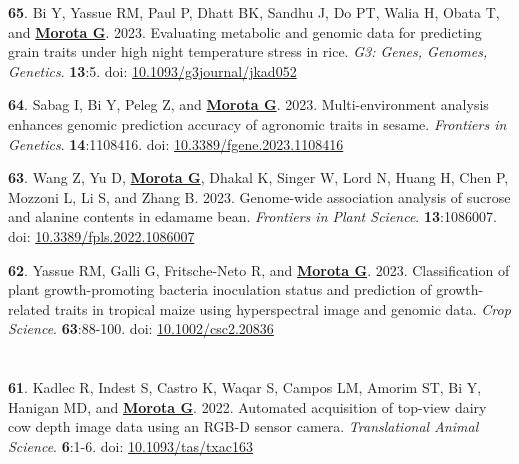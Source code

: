 \documentclass[margin,line,10pt]{res}
\newenvironment{list1}{
  \begin{list}{\ding{113}}{%
      \setlength{\itemsep}{0in}
      \setlength{\parsep}{0in} \setlength{\parskip}{0in}
      \setlength{\topsep}{0in} \setlength{\partopsep}{0in} 
      \setlength{\leftmargin}{0.17in}}}{\end{list}}
\begin{document}
\begin{resume}
\begin{list1}
  \vspace{0.5cm}

  \item [{\bf 65}.] Bi Y, Yassue RM, Paul P, Dhatt BK, Sandhu J, Do PT, Walia H, Obata T, and \textbf{\underline{Morota G}}. 2023. Evaluating metabolic and genomic data for predicting grain traits under high night temperature stress in rice. \emph{G3: Genes, Genomes, Genetics}. \textbf{13}:5. doi: \textcolor{blue}{\href{https://doi.org/10.1093/g3journal/jkad052}{10.1093/g3journal/jkad052}}  

  \vspace{0.5cm}

  \item [{\bf 64}.] Sabag I, Bi Y, Peleg Z, and \textbf{\underline{Morota G}}. 2023. Multi-environment analysis enhances genomic prediction accuracy of agronomic traits in sesame. \emph{Frontiers in Genetics}. \textbf{14}:1108416. doi: \textcolor{blue}{\href{https://doi.org/10.3389/fgene.2023.1108416}{10.3389/fgene.2023.1108416}}  

     \vspace{0.5cm}

  \item  [{\bf 63}.] Wang Z, Yu D, \textbf{\underline{Morota G}}, Dhakal K, Singer W, Lord N, Huang H, Chen P, Mozzoni L, Li S, and Zhang B. 2023. Genome-wide association analysis of sucrose and alanine contents in edamame bean. \emph{Frontiers in Plant Science}. \textbf{13}:1086007. doi: \textcolor{blue}{\href{10.3389/fpls.2022.1086007}{10.3389/fpls.2022.1086007}}  

  \vspace{0.5cm}

  \item [{\bf 62}.] Yassue RM, Galli G, Fritsche-Neto R, and \textbf{\underline{Morota G}}. 2023. Classification of plant growth-promoting bacteria inoculation status and prediction of growth-related traits in tropical maize using hyperspectral image and genomic data. \emph{Crop Science}. \textbf{63}:88-100. doi: \textcolor{blue}{\href{https://doi.org/10.1002/csc2.20836}{10.1002/csc2.20836}}  


\end{list1}


\section{}
\begin{list1}

  \item  [{\bf 61}.] Kadlec R, Indest S, Castro K, Waqar S, Campos LM, Amorim ST, Bi Y, Hanigan MD, and \textbf{\underline{Morota G}}. 2022. Automated acquisition of top-view dairy cow depth image data using an RGB-D sensor camera. \emph{Translational Animal Science}. \textbf{6}:1-6. doi: \textcolor{blue}{\href{https://doi.org/10.1093/tas/txac163}{10.1093/tas/txac163}}  


\end{list1}
\end{resume}
\end{document}
